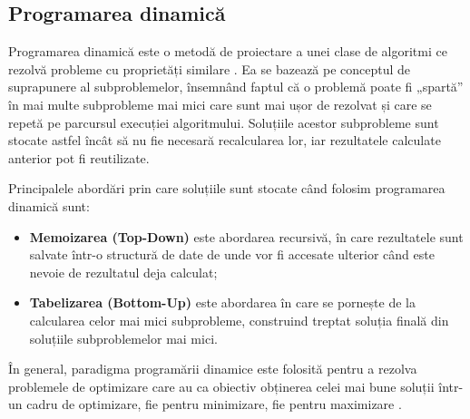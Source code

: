 \begin{sloppypar}
\subsection*{Programarea dinamică}
Programarea dinamică este o metodă de proiectare a unei clase de algoritmi ce rezolvă probleme cu proprietăți similare \cite{Algorithm-Design}. Ea se bazează pe conceptul de suprapunere al subproblemelor, însemnând faptul că o problemă poate fi „spartă” în mai multe subprobleme mai mici care sunt mai ușor de rezolvat și care se repetă pe parcursul execuției algoritmului. 
Soluțiile acestor subprobleme sunt stocate astfel încât să nu fie necesară recalcularea lor, iar rezultatele calculate anterior pot fi reutilizate. \cite{DP-javatpoint} \par 
Principalele abordări prin care soluțiile sunt stocate când folosim programarea dinamică sunt:
\begin{itemize}
     \item \textbf{Memoizarea (Top-Down)} este abordarea recursivă, în care rezultatele sunt salvate într-o structură de date de unde vor fi accesate ulterior când este nevoie de rezultatul deja calculat;
     \item \textbf{Tabelizarea (Bottom-Up)} este abordarea în care se pornește de la calcularea celor mai mici subprobleme, construind treptat soluția finală din soluțiile subproblemelor mai mici. \cite{DP-GG}
\end{itemize} \par
În general, paradigma programării dinamice este folosită pentru a rezolva problemele de optimizare care au ca obiectiv obținerea celei mai bune soluții într-un cadru de optimizare, fie pentru minimizare, fie pentru maximizare \cite{Algorithm-Design}. \par



\end{sloppypar}
